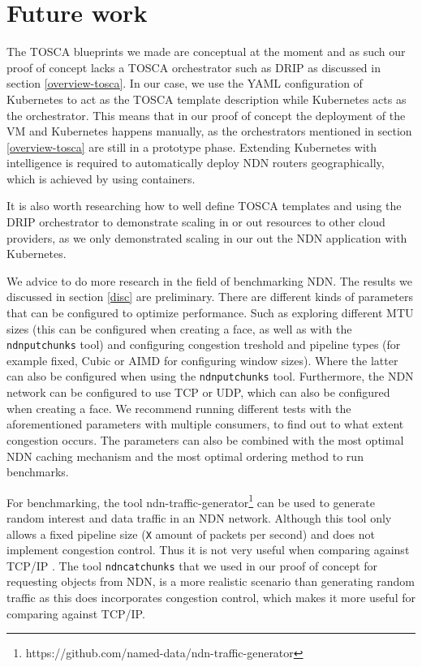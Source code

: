 \section{Future work}\label{fut}

The TOSCA blueprints we made are conceptual at the moment and as such our proof of concept lacks a TOSCA orchestrator such as DRIP as discussed in section \ref{overview-tosca}. In our case, we use the YAML configuration of Kubernetes to act as the TOSCA template description while Kubernetes acts as the orchestrator. This means that in our proof of concept the deployment of the VM and Kubernetes happens manually, as the orchestrators mentioned in section \ref{overview-tosca} are still in a prototype phase. 
Extending Kubernetes with intelligence is required to automatically deploy NDN routers geographically, which is achieved by using containers.

It is also worth researching how to well define TOSCA templates and using the DRIP orchestrator to demonstrate scaling in or out resources to other cloud providers, as we only demonstrated scaling in our out the NDN application with Kubernetes. 

We advice to do more research in the field of benchmarking NDN. The results we discussed in section \ref{disc} are preliminary. There are different kinds of parameters that can be configured to optimize performance. Such as exploring different MTU sizes (this can be configured when creating a face, as well as with the \texttt{ndnputchunks} tool) and configuring congestion treshold and pipeline types (for example fixed, Cubic or AIMD for configuring window sizes). Where the latter can also be configured when using the \texttt{ndnputchunks} tool. Furthermore, the NDN network can be configured to use TCP or UDP, which can also be configured when creating a face. We recommend running different tests with the aforementioned parameters with multiple consumers, to find out to what extent congestion occurs.
The parameters can also be combined with the most optimal NDN caching mechanism and the most optimal ordering method \cite{koulouzis2018information} to run benchmarks.

For benchmarking, the tool ndn-traffic-generator\footnote{https://github.com/named-data/ndn-traffic-generator} can be used to generate random interest and data traffic in an NDN network. Although this tool only allows a fixed pipeline size (\texttt{X} amount of packets per second) and does not implement congestion control. Thus it is not very useful when comparing against TCP/IP \cite{ndnput-mem}. The tool \texttt{ndncatchunks} that we used in our proof of concept for requesting objects from NDN, is a more realistic scenario than generating random traffic as this does incorporates congestion control, which makes it more useful for comparing against TCP/IP.

